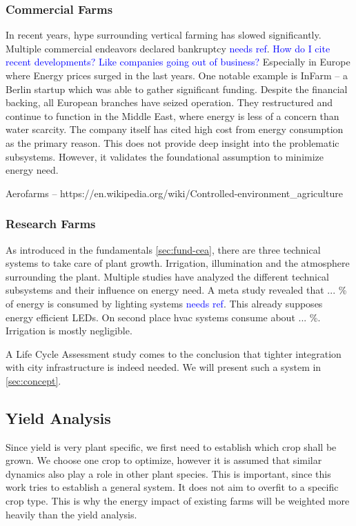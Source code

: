 \subsubsection{Commercial Farms}
\label{subsub:prop-ener-commercialfarms}
In recent years, hype surrounding vertical farming has slowed significantly.
Multiple commercial endeavors declared bankruptcy \textcolor{Blue}{needs ref}.
\textcolor{Blue}{How do I cite recent developments? Like companies going out of business?}
Especially in Europe where Energy prices surged in the last years.
One notable example is InFarm -- a Berlin startup which was able to gather significant funding.
Despite the financial backing, all European branches have seized operation.
They restructured and continue to function in the Middle East, where energy is less of a concern than water scarcity.
The company itself has cited high cost from energy consumption as the primary reason.
This does not provide deep insight into the problematic subsystems.
However, it validates the foundational assumption to minimize energy need.

Aerofarms -- https://en.wikipedia.org/wiki/Controlled-environment\_agriculture

\subsubsection{Research Farms}
As introduced in the fundamentals \ref{sec:fund-cea}, there are three technical systems to take care of plant growth.
Irrigation, illumination and the atmosphere surrounding the plant.
Multiple studies have analyzed the different technical subsystems and their influence on energy need.
A meta study revealed that ... \% of energy is consumed by lighting systems \textcolor{Blue}{needs ref}.
This already supposes energy efficient LEDs.
On second place \ac{hvac} systems consume about ... \%.
Irrigation is mostly negligible.

A Life Cycle Assessment study comes to the conclusion that tighter integration with city infrastructure is indeed needed.
We will present such a system in \ref{sec:concept}.

\subsection{Yield Analysis}
\label{sub:yield-analysis}
Since yield is very plant specific, we first need to establish which crop shall be grown.
We choose one crop to optimize, however it is assumed that similar dynamics also play a role in other plant species.
This is important, since this work tries to establish a general system.
It does not aim to overfit to a specific crop type.
This is why the energy impact of existing farms will be weighted more heavily than the yield analysis.

